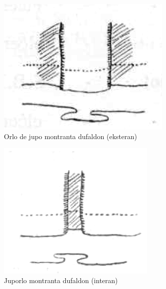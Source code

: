 \begin{center}\includegraphics[keepaspectratio,width=\textwidth,height=0.75\textheight]{13.png}\\
Orlo de jupo montranta dufaldon (eksteran)\end{center}

\begin{center}\includegraphics[keepaspectratio,width=\textwidth,height=0.75\textheight]{14.png}\\
Juporlo montranta dufaldon (interan)\end{center}

